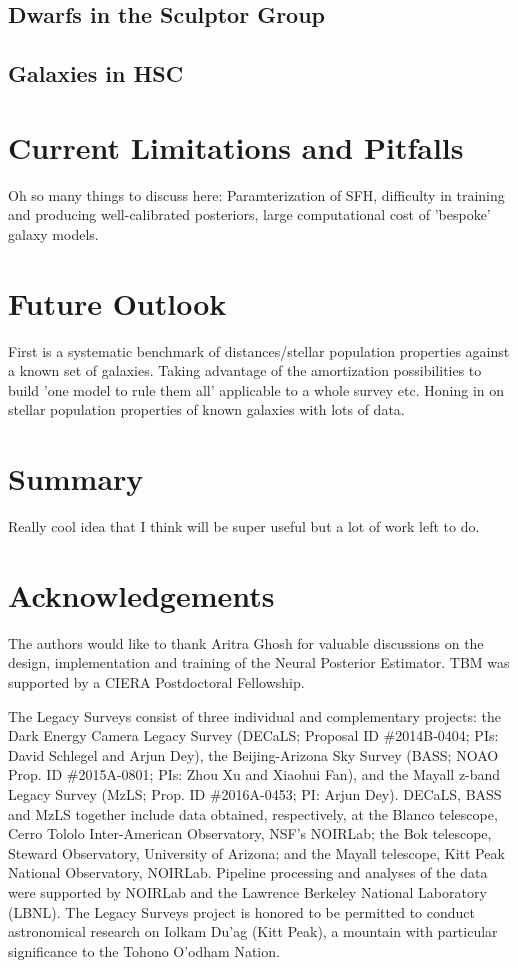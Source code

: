 \documentclass[twocolumn]{aastex631}
\begin{document}
\subsection{Dwarfs in the Sculptor Group}
\label{sec:scul}
\subsection{Galaxies in HSC}
\label{sec:hsc}

\section{Current Limitations and Pitfalls}
\label{sec:issues}
Oh so many things to discuss here: Paramterization of SFH, difficulty in training and producing well-calibrated posteriors, large computational cost of 'bespoke' galaxy models.

\section{Future Outlook}
\label{sec:future}
First is a systematic benchmark of distances/stellar population properties against a known set of galaxies. Taking advantage of the amortization possibilities to build 'one model to rule them all' applicable to a whole survey etc. Honing in on stellar population properties of known galaxies with lots of data.

\section{Summary}
\label{sec:summary}
Really cool idea that I think will be super useful but a lot of work left to do.

\section*{Acknowledgements}
The authors would like to thank Aritra Ghosh for valuable discussions on the design, implementation and training of the Neural Posterior Estimator. TBM was supported by a CIERA Postdoctoral Fellowship.

The Legacy Surveys consist of three individual and complementary projects: the Dark Energy Camera Legacy Survey (DECaLS; Proposal ID \#2014B-0404; PIs: David Schlegel and Arjun Dey), the Beijing-Arizona Sky Survey (BASS; NOAO Prop. ID \#2015A-0801; PIs: Zhou Xu and Xiaohui Fan), and the Mayall z-band Legacy Survey (MzLS; Prop. ID \#2016A-0453; PI: Arjun Dey). DECaLS, BASS and MzLS together include data obtained, respectively, at the Blanco telescope, Cerro Tololo Inter-American Observatory, NSF’s NOIRLab; the Bok telescope, Steward Observatory, University of Arizona; and the Mayall telescope, Kitt Peak National Observatory, NOIRLab. Pipeline processing and analyses of the data were supported by NOIRLab and the Lawrence Berkeley National Laboratory (LBNL). The Legacy Surveys project is honored to be permitted to conduct astronomical research on Iolkam Du’ag (Kitt Peak), a mountain with particular significance to the Tohono O’odham Nation.
\end{document}
